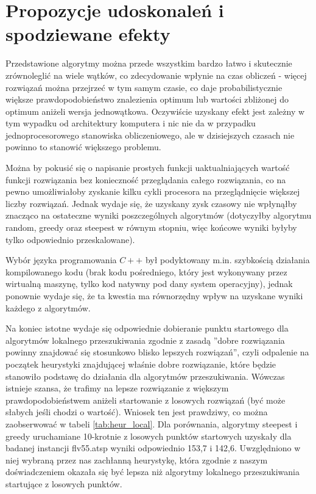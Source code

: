 \section{Propozycje udoskonaleń i spodziewane efekty}
Przedstawione algorytmy można przede wszystkim bardzo łatwo i skutecznie zrównoleglić na wiele wątków, co zdecydowanie wpłynie na czas obliczeń - więcej rozwiązań można przejrzeć w tym samym czasie, co daje probabilistycznie większe prawdopodobieństwo znalezienia optimum lub wartości zbliżonej do optimum aniżeli wersja jednowątkowa. Oczywiście uzyskany efekt jest zależny w tym wypadku od architektury komputera i nic nie da w przypadku jednoprocesorowego stanowiska obliczeniowego, ale w dzisiejszych czasach nie powinno to stanowić większego problemu.

Można by pokusić się o napisanie prostych funkcji uaktualniających wartość funkcji rozwiązania bez konieczność przeglądania całego rozwiązania, co na pewno umożliwiałoby zyskanie kilku cykli procesora na przeglądnięcie większej liczby rozwiązań. Jednak wydaje się, że uzyskany zysk czasowy nie wpłynąłby znacząco na ostateczne wyniki poszczególnych algorytmów (dotyczyłby algorytmu random, greedy oraz steepest w równym stopniu, więc końcowe wyniki byłyby tylko odpowiednio przeskalowane).

Wybór języka programowania $C++$ był podyktowany m.in. szybkością działania kompilowanego kodu (brak kodu pośredniego, który jest wykonywany przez wirtualną maszynę, tylko kod natywny pod dany system operacyjny), jednak ponownie wydaje się, że ta kwestia ma równorzędny wpływ na uzyskane wyniki każdego z algorytmów.

Na koniec istotne wydaje się odpowiednie dobieranie punktu startowego dla algorytmów lokalnego przeszukiwania zgodnie z zasadą ''dobre rozwiązania powinny znajdować się stosunkowo blisko lepszych rozwiązań'', czyli odpalenie na początek heurystyki znajdującej właśnie dobre rozwiązanie, które będzie stanowiło podstawę do działania dla algorytmów przeszukiwania. Wówczas istnieje szansa, że trafimy na lepsze rozwiązanie z większym prawdopodobieństwem aniżeli startowanie z losowych rozwiązań (być może słabych jeśli chodzi o wartość). Wniosek ten jest prawdziwy, co można zaobserwować w tabeli \ref{tab:heur_local}. Dla porównania, algorytmy steepest i greedy uruchamiane 10-krotnie z losowych punktów startowych uzyskały dla badanej instancji flv55.atsp wyniki odpowiednio 153,7 i 142,6. Uwzględniono w niej wybraną przez nas zachłanną heurystykę, która zgodnie z naszym doświadczeniem okazała się być lepsza niż algorytmy lokalnego przeszukiwania startujące z losowych punktów.

